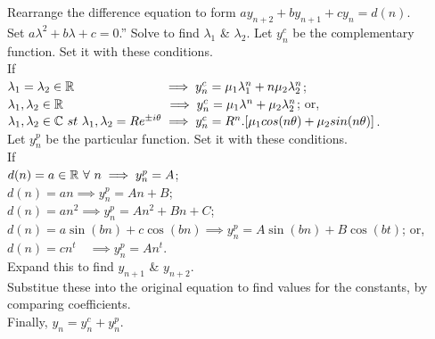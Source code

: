 \documentclass[11pt,a4paper]{article}
\begin{document}
\subtitle{Process}
Rearrange the difference equation to form $ay_{n+2} + by_{n+1} + cy_n = d(n)$.\\
Set $a\lambda^2 + b\lambda + c = 0$.''
Solve to find $\lambda_1$ \& $\lambda_2$.
Let $y_n^c$ be the complementary function. Set it with these conditions.\\
If\\
\-\hspace{2em} $\lambda_1 = \lambda_2 \in \mathbb{R} \quad \quad \quad \quad \quad \quad \quad \implies y_n^c = \mu_1\lambda_1^n + n\mu_2\lambda_2^n$;\\
\-\hspace{2em} $\lambda_1, \lambda_2 \in \mathbb{R}\quad \quad \quad \quad \quad \quad \quad \quad \implies y_n^c = \mu_1\lambda^n + \mu_2\lambda_2^n$; or,\\
\-\hspace{2em} $\lambda_1, \lambda_2 \in \complex\ st\ \lambda_1, \lambda_2 = Re^{\pm i\theta} \implies y_n^c = R^n.[\mu_1 cos(n\theta)+\mu_2 sin(n\theta)]$.\\
Let $y_n^p$ be the particular function. Set it with these conditions.\\
If\\
\-\hspace{2em} $d(n) = a \in \mathbb{R}\ \forall\ n \implies y_n^p = A$;\\
\-\hspace{2em} $d(n) = an \implies y_n^p = An + B$;\\
\-\hspace{2em} $d(n) = an^2 \implies y_n^p = An^2 + Bn + C$;\\
\-\hspace{2em} $d(n) = a\sin(bn) + c\cos(bn) \implies y_n^p = A\sin(bn) + B\cos(bt)$; or,\\
\-\hspace{2em} $d(n) = cn^t\quad \implies y_n^p = An^t$.\\
Expand this to find $y_{n+1}$ \& $y_{n+2}$.\\
Substitue these into the original equation to find values for the constants, by comparing coefficients.\\
Finally, $y_n = y_n^c + y_n^p$.\\
\end{document}
